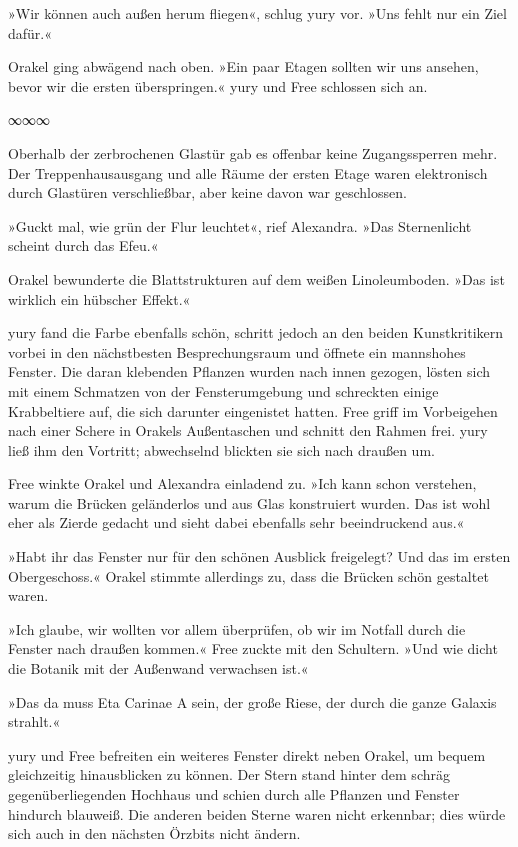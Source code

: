 »Wir können auch außen herum fliegen«, schlug yury vor. »Uns fehlt nur ein Ziel dafür.«

Orakel ging abwägend nach oben. »Ein paar Etagen sollten wir uns ansehen, bevor wir die ersten überspringen.« yury und Free schlossen sich an.

\begin{center}
∞∞∞
\end{center}

Oberhalb der zerbrochenen Glastür gab es offenbar keine Zugangssperren mehr. Der Treppenhausausgang und alle Räume der ersten Etage waren elektronisch durch Glastüren verschließbar, aber keine davon war geschlossen.

»Guckt mal, wie grün der Flur leuchtet«, rief Alexandra. »Das Sternenlicht scheint durch das Efeu.«

Orakel bewunderte die Blattstrukturen auf dem weißen Linoleumboden. »Das ist wirklich ein hübscher Effekt.«

yury fand die Farbe ebenfalls schön, schritt jedoch an den beiden Kunstkritikern vorbei in den nächstbesten Besprechungsraum und öffnete ein mannshohes Fenster. Die daran klebenden Pflanzen wurden nach innen gezogen, lösten sich mit einem Schmatzen von der Fensterumgebung und schreckten einige Krabbeltiere auf, die sich darunter eingenistet hatten. Free griff im Vorbeigehen nach einer Schere in Orakels Außentaschen und schnitt den Rahmen frei. yury ließ ihm den Vortritt; abwechselnd blickten sie sich nach draußen um.

Free winkte Orakel und Alexandra einladend zu. »Ich kann schon verstehen, warum die Brücken geländerlos und aus Glas konstruiert wurden. Das ist wohl eher als Zierde gedacht und sieht dabei ebenfalls sehr beeindruckend aus.«

»Habt ihr das Fenster nur für den schönen Ausblick freigelegt? Und das im ersten Obergeschoss.« Orakel stimmte allerdings zu, dass die Brücken schön gestaltet waren.

»Ich glaube, wir wollten vor allem überprüfen, ob wir im Notfall durch die Fenster nach draußen kommen.« Free zuckte mit den Schultern. »Und wie dicht die Botanik mit der Außenwand verwachsen ist.«

»Das da muss Eta Carinae A sein, der große Riese, der durch die ganze Galaxis strahlt.«

yury und Free befreiten ein weiteres Fenster direkt neben Orakel, um bequem gleichzeitig hinausblicken zu können. Der Stern stand hinter dem schräg gegenüberliegenden Hochhaus und schien durch alle Pflanzen und Fenster hindurch blauweiß. Die anderen beiden Sterne waren nicht erkennbar; dies würde sich auch in den nächsten Örzbits nicht ändern.

